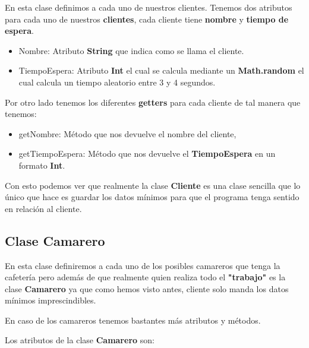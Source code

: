 \documentclass{article}
\begin{document}
En esta clase definimos a cada uno de nuestros clientes. Tenemos dos atributos para cada uno de nuestros \textbf{clientes}, cada cliente tiene \textbf{nombre} y \textbf{tiempo de espera}.

\begin{itemize}
    \item Nombre: Atributo \textbf{String} que indica como se llama el cliente.
    \item TiempoEspera: Atributo \textbf{Int} el cual se calcula mediante un \textbf{Math.random} el cual calcula un tiempo aleatorio entre 3 y 4 segundos.
\end{itemize}

Por otro lado tenemos los diferentes \textbf{getters} para cada cliente de tal manera que tenemos:

\begin{itemize}
    \item getNombre: Método que nos devuelve el nombre del cliente,
    \item getTiempoEspera: Método que nos devuelve el \textbf{TiempoEspera} en un formato \textbf{Int}. 
\end{itemize}

Con esto podemos ver que realmente la clase \textbf{Cliente} es una clase sencilla que lo único que hace es guardar los datos mínimos para que el programa tenga sentido en relación al cliente.

\subsection{Clase Camarero}

En esta clase definiremos a cada uno de los posibles camareros que tenga la cafetería pero además de que  realmente quien realiza todo el \textbf{"trabajo"} es la clase \textbf{Camarero} ya que como hemos visto antes, cliente solo manda los datos mínimos imprescindibles.

En caso de los camareros tenemos bastantes más atributos y métodos.

Los atributos de la clase \textbf{Camarero} son:
\end{document}
